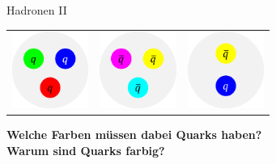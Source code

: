 \begin{frame}{Hadronen II}
\begin{table}[]
\begin{tabular}{ccc}
         \includegraphics[width=2.5cm]{Figures Lecture on Hadrons/Baryon_scheme.png} &\includegraphics[width=2.5cm]{Figures Lecture on Hadrons/Antibaryon_scheme.png} &\includegraphics[width=2.5cm]{Figures Lecture on Hadrons/Meson_scheme.png} 
    \end{tabular}
    \label{tab:my_label}
\end{table}
  \end{frame}

\begin{frame}
\textbf{Welche Farben müssen dabei Quarks haben? }\\ \textbf{Warum sind Quarks farbig?}
\end{frame}


